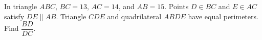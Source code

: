 In triangle $ABC$, $BC=13$, $AC=14$, and $AB=15$. Points $D\in BC$ and $E\in AC$ satisfy $DE\parallel AB$. Triangle $CDE$ and quadrilateral $ABDE$ have equal perimeters. Find $\dfrac{BD}{DC}$.
